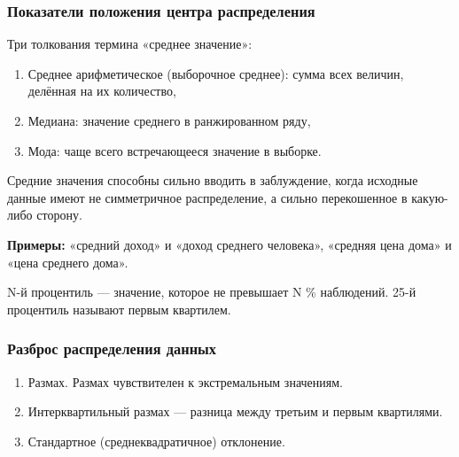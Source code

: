 \documentclass[11pt,a4paper]{article}
\providecommand{\tightlist}{%
      \setlength{\itemsep}{0pt}\setlength{\parskip}{0pt}}
\begin{document}
    \hypertarget{ux43fux43eux43aux430ux437ux430ux442ux435ux43bux438-ux43fux43eux43bux43eux436ux435ux43dux438ux44f-ux446ux435ux43dux442ux440ux430-ux440ux430ux441ux43fux440ux435ux434ux435ux43bux435ux43dux438ux44f}{%
\subsubsection{Показатели положения центра
распределения}\label{ux43fux43eux43aux430ux437ux430ux442ux435ux43bux438-ux43fux43eux43bux43eux436ux435ux43dux438ux44f-ux446ux435ux43dux442ux440ux430-ux440ux430ux441ux43fux440ux435ux434ux435ux43bux435ux43dux438ux44f}}

Три толкования термина «среднее значение»:

\begin{enumerate}
\def\labelenumi{\arabic{enumi}.}
\tightlist
\item
  Среднее арифметическое (выборочное среднее): сумма всех величин,
  делённая на их количество,
\item
  Медиана: значение среднего в ранжированном ряду,
\item
  Мода: чаще всего встречающееся значение в выборке.
\end{enumerate}

Средние значения способны сильно вводить в заблуждение, когда исходные
данные имеют не симметричное распределение, а сильно перекошенное в
какую-либо сторону.

\textbf{Примеры:} «средний доход» и «доход среднего человека», «средняя
цена дома» и «цена среднего дома».

N-й процентиль --- значение, которое не превышает N \% наблюдений. 25-й
процентиль называют первым квартилем.

    \hypertarget{ux440ux430ux437ux431ux440ux43eux441-ux440ux430ux441ux43fux440ux435ux434ux435ux43bux435ux43dux438ux44f-ux434ux430ux43dux43dux44bux445}{%
\subsubsection{Разброс распределения
данных}\label{ux440ux430ux437ux431ux440ux43eux441-ux440ux430ux441ux43fux440ux435ux434ux435ux43bux435ux43dux438ux44f-ux434ux430ux43dux43dux44bux445}}

\begin{enumerate}
\def\labelenumi{\arabic{enumi}.}
\tightlist
\item
  Размах. Размах чувствителен к экстремальным значениям.
\item
  Интерквартильный размах --- разница между третьим и первым квартилями.
\item
  Стандартное (среднеквадратичное) отклонение.
\end{enumerate}
\end{document}
